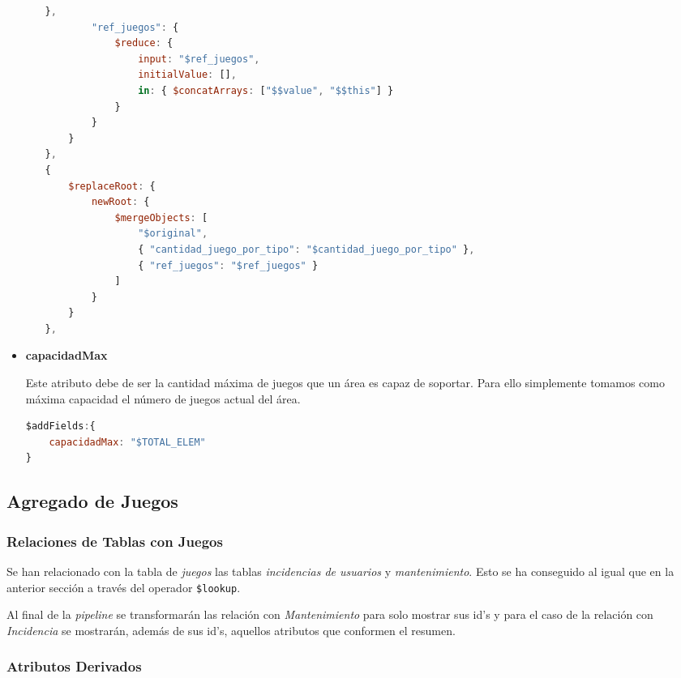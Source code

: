 \documentclass[]{article}
\begin{document}
\begin{itemize}
\begin{enumerate}
\begin{lstlisting}[caption=Creación de nuevo campo en el documento original, language=JavaScript]
        },
        "ref_juegos": {
            $reduce: {
                input: "$ref_juegos",
                initialValue: [],
                in: { $concatArrays: ["$$value", "$$this"] }
            }
        }
    }
},
{
    $replaceRoot: {
        newRoot: {
            $mergeObjects: [
                "$original",
                { "cantidad_juego_por_tipo": "$cantidad_juego_por_tipo" },
                { "ref_juegos": "$ref_juegos" }
            ]
        }
    }
},

\end{lstlisting}
    \end{enumerate}

    \item \textbf{capacidadMax}
    
    Este atributo debe de ser la cantidad máxima de juegos que un área es capaz de soportar. Para ello simplemente tomamos como máxima capacidad el número de juegos actual del área.
    \begin{lstlisting}[language=JavaScript, caption=Cálculo de la capacidad máxima]
$addFields:{
    capacidadMax: "$TOTAL_ELEM"
}
    \end{lstlisting}
\end{itemize}

\subsection{Agregado de Juegos}
\label{subsec:agregado_juego}

\subsubsection{Relaciones de Tablas con Juegos}
\label{subsubsec:relaciones_juego}

Se han relacionado con la tabla de \textit{juegos} las tablas \textit{incidencias de usuarios} y \textit{mantenimiento}. Esto se ha conseguido al igual que en la anterior sección a través del operador \texttt{\$lookup}.

Al final de la \textit{pipeline} se transformarán las relación con \textit{Mantenimiento} para solo mostrar sus id's y para el caso de la relación con \textit{Incidencia} se mostrarán, además de sus id's, aquellos atributos que conformen el resumen. 

\subsubsection{Atributos Derivados}
\label{subsubsec:derivados_juego}
\end{document}
